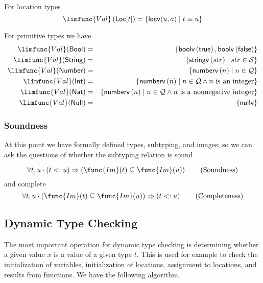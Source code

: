 \documentclass[12pt]{article}
\begin{document}
For location types%
\begin{equation*}
\limfunc{Val}\left( \mathsf{Loc}[t]\right) =\left\{ \mathsf{locv}(u,a)\mid
t\equiv u\right\} 
\end{equation*}

For primitive types we have%
\begin{eqnarray*}
\limfunc{Val}(\mathsf{Bool}) &=&\left\{ \mathsf{boolv}\left( \mathsf{true}%
\right) ,\mathsf{boolv}\left( \mathsf{false}\right) \right\}  \\
\limfunc{Val}(\mathsf{String}) &=&\left\{ \mathsf{stringv}\left( str\right)
\mid str\in \mathcal{S}\right\}  \\
\limfunc{Val}(\mathsf{Number}) &=&\left\{ \mathsf{numberv}\left( n\right)
\mid n\in \mathcal{Q}\right\}  \\
\limfunc{Val}(\mathsf{Int}) &=&\left\{ \mathsf{numberv}\left( n\right) \mid
n\in \mathcal{Q}\wedge n\text{ is an integer}\right\}  \\
\limfunc{Val}(\mathsf{Nat}) &=&\left\{ \mathsf{numberv}\left( n\right) \mid
n\in \mathcal{Q}\wedge n\text{ is a nonnegative integer}\right\}  \\
\limfunc{Val}(\mathsf{Null}) &=&\left\{ \mathsf{nullv}\right\} 
\end{eqnarray*}

\subsubsection{Soundness}

At this point we have formally defined types, subtyping, and images; so we
can ask the questions of whether the subtyping relation is sound

\begin{equation}
\forall t,u\cdot \left( t<:u\right) \Rightarrow \left( \func{Im}(t)\subseteq 
\func{Im}(u)\right)   \tag{Soundness}
\end{equation}%
and complete%
\begin{equation}
\forall t,u\cdot \left( \func{Im}(t)\subseteq \func{Im}(u)\right)
\Rightarrow \left( t<:u\right)   \tag{Completeness}
\end{equation}

\subsection{Dynamic Type Checking}

The most important operation for dynamic type checking is determining
whether a given value $x$ is a value of a given type $t$. This is used for
example to check the initialization of variables, initialization of
locations, assignment to locations, and results from functions. We have the
following algorithm.
\end{document}

